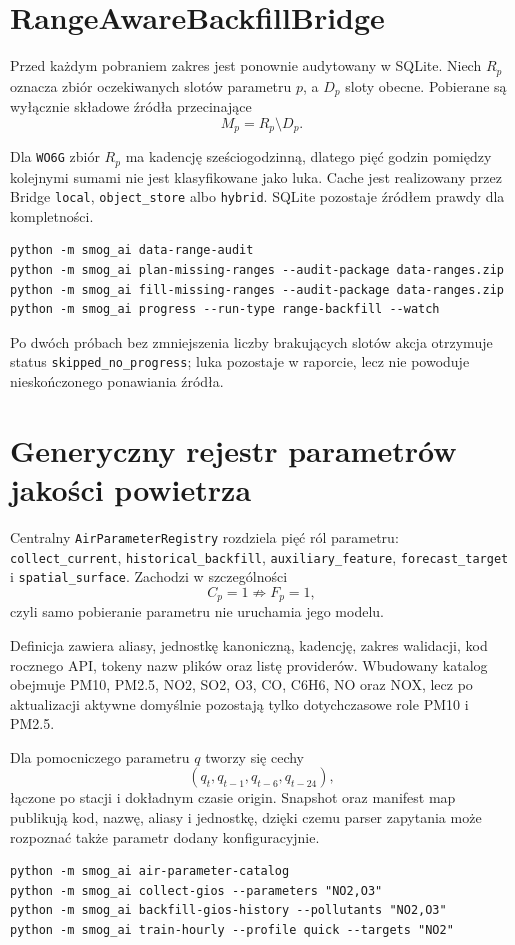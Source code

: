 \documentclass[11pt,a4paper,oneside]{article}
\begin{document}
\section{RangeAwareBackfillBridge}

Przed każdym pobraniem zakres jest ponownie audytowany w SQLite. Niech
$R_p$ oznacza zbiór oczekiwanych slotów parametru $p$, a $D_p$ sloty obecne.
Pobierane są wyłącznie składowe źródła przecinające
\[
 M_p=R_p\setminus D_p.
\]

Dla \texttt{WO6G} zbiór $R_p$ ma kadencję sześciogodzinną, dlatego pięć godzin
pomiędzy kolejnymi sumami nie jest klasyfikowane jako luka. Cache jest
realizowany przez Bridge \texttt{local}, \texttt{object\_store} albo
\texttt{hybrid}. SQLite pozostaje źródłem prawdy dla kompletności.

\begin{lstlisting}[style=code]
python -m smog_ai data-range-audit
python -m smog_ai plan-missing-ranges --audit-package data-ranges.zip
python -m smog_ai fill-missing-ranges --audit-package data-ranges.zip
python -m smog_ai progress --run-type range-backfill --watch
\end{lstlisting}

Po dwóch próbach bez zmniejszenia liczby brakujących slotów akcja otrzymuje
status \texttt{skipped\_no\_progress}; luka pozostaje w raporcie, lecz nie
powoduje nieskończonego ponawiania źródła.


\section{Generyczny rejestr parametrów jakości powietrza}

Centralny \texttt{AirParameterRegistry} rozdziela pięć ról parametru:
\texttt{collect\_current}, \texttt{historical\_backfill},
\texttt{auxiliary\_feature}, \texttt{forecast\_target} i
\texttt{spatial\_surface}. Zachodzi w szczególności
\[
 C_p=1\not\Rightarrow F_p=1,
\]
czyli samo pobieranie parametru nie uruchamia jego modelu.

Definicja zawiera aliasy, jednostkę kanoniczną, kadencję, zakres walidacji,
kod rocznego API, tokeny nazw plików oraz listę providerów. Wbudowany katalog
obejmuje PM10, PM2.5, NO2, SO2, O3, CO, C6H6, NO oraz NOX, lecz po aktualizacji
aktywne domyślnie pozostają tylko dotychczasowe role PM10 i PM2.5.

Dla pomocniczego parametru $q$ tworzy się cechy
\[
 (q_t,q_{t-1},q_{t-6},q_{t-24}),
\]
łączone po stacji i dokładnym czasie origin. Snapshot oraz manifest map
publikują kod, nazwę, aliasy i jednostkę, dzięki czemu parser zapytania może
rozpoznać także parametr dodany konfiguracyjnie.

\begin{lstlisting}[style=code]
python -m smog_ai air-parameter-catalog
python -m smog_ai collect-gios --parameters "NO2,O3"
python -m smog_ai backfill-gios-history --pollutants "NO2,O3"
python -m smog_ai train-hourly --profile quick --targets "NO2"
\end{lstlisting}
\end{document}
